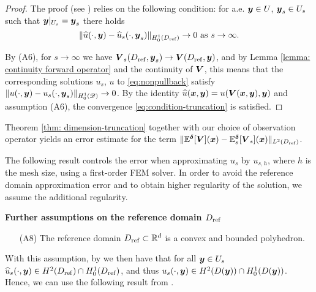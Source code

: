 \documentclass[graybox]{svmult}
\begin{document}
\begin{proof}
    The proof (see {\cite[Theorem 4.3]{gk22}}) relies on the following condition: for a.e. ${\boldsymbol{y}} \in U$, ${\boldsymbol{y}}_s \in U_s$ such that ${\boldsymbol{y}}|_{U_s} = {\boldsymbol{y}}_s$ there holds
        \begin{equation}
            \| \widehat u(\cdot, \boldsymbol{y}) - \widehat u_s(\cdot, {\boldsymbol{y}}_s) \|_{H_0^1(D_{\rm ref})} \to 0 \text{ as } s \to \infty.
            \label{eq:condition-truncation}
        \end{equation}
     
     By (A6), for $s \to \infty$ we have ${\boldsymbol{V}}_s(D_{\rm ref}, {\boldsymbol{y}}_s) \to {\boldsymbol{V}}(D_{\rm ref}, {\boldsymbol{y}})$, and by Lemma \ref{lemma: continuity forward operator} and the continuity of ${\boldsymbol{V}}$, this means that the corresponding solutions $u_s$, $u$ to \eqref{eq:nonpullback} satisfy $\| u(\cdot, {\boldsymbol{y}}) - u_s(\cdot, {\boldsymbol{y}}_s) \|_{H_0^1(\mathscr D)} \to 0$. By the identity $\widehat u({\boldsymbol{x}}, {\boldsymbol{y}}) = u({\boldsymbol{V}}({\boldsymbol{x}}, {\boldsymbol{y}}), {\boldsymbol{y}})$ and assumption (A6), the convergence \eqref{eq:condition-truncation} is satisfied.
\end{proof}

Theorem \ref{thm: dimension-truncation} together with our choice of observation operator yields an error estimate for the term ${\| \mathbb{E}^{{\boldsymbol{\delta}}}[{\boldsymbol{V}}]({\boldsymbol{x}}) - \mathbb{E}_{s}^{{\boldsymbol{\delta}}}[{\boldsymbol{V}}_s]({\boldsymbol{x}})\|_{L^2(D_{\rm ref})}}$.
 
The following result controls the error when approximating $u_s$ by $u_{s,h}$, where $h$ is the mesh size, using a first-order FEM solver. In order to avoid the reference domain approximation error and to obtain higher regularity of the solution, we assume the additional regularity.

\bigskip

\begin{samepage}\noindent \textbf{Further assumptions on the reference domain $D_{\rm ref}$}
\begin{addmargin}[1.3em]{0em}
\begin{enumerate}
    \item [(A8)] The reference domain $D_{\rm ref}\subset\mathbb R^d$ is a convex and bounded polyhedron. \label{a8}
\end{enumerate}
\end{addmargin}\end{samepage}
\bigskip

With this assumption, by \cite[Theorem 3.2.1.2]{Grisvard} we then have that for all ${\boldsymbol{y}} \in U_s$ $\widehat u_s(\cdot, \boldsymbol{y}) \in H^2(D_{\rm{ref}}) \cap H_0^1(D_{\rm{ref}})$, and thus $u_s(\cdot, \boldsymbol{y}) \in H^2(D({\boldsymbol{y}})) \cap H_0^1(D({\boldsymbol{y}}))$. Hence, we can use the following result from \cite{Qu2014}.
\end{document}
